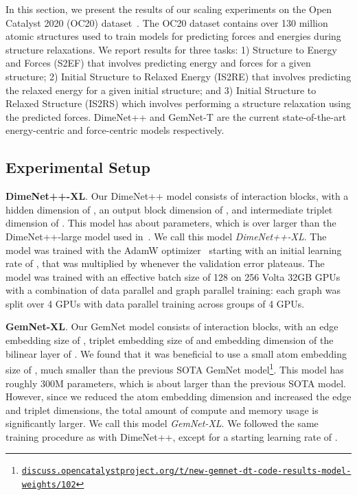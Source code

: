 \documentclass{article} \usepackage{iclr2022_conference,times}
\begin{document}
In this section, we present the results of our scaling experiments on the Open Catalyst 2020 (OC20) dataset~\citep{OC20}. The OC20 dataset contains over 130 million atomic structures used to train models for predicting forces and energies during structure relaxations. We report results for three tasks: 1) Structure to Energy and Forces (S2EF) that involves predicting energy and forces for a given structure; 2) Initial Structure to Relaxed Energy (IS2RE) that involves predicting the relaxed energy for a given initial structure; and 3) Initial Structure to Relaxed Structure (IS2RS) which involves performing a structure relaxation using the predicted forces. DimeNet++ and GemNet-T are the current state-of-the-art energy-centric and force-centric models respectively.

\subsection{Experimental Setup}

\textbf{DimeNet++-XL}. Our DimeNet++ model consists of  interaction blocks, with a hidden dimension of , an output block dimension of , and intermediate triplet dimension of . This model has about  parameters, which is over  larger than the DimeNet++-large model used in~\citep{OC20}. We call this model \emph{DimeNet++-XL}. The model was trained with the AdamW optimizer~\citep{kingma2014adam,loshchilov2019decoupled} starting with an initial learning rate of , that was multiplied by  whenever the validation error plateaus. The model was trained with an effective batch size of 128 on 256 Volta 32GB GPUs with a combination of data parallel and graph parallel training: each graph was split over 4 GPUs with data parallel training across groups of 4 GPUs.

\textbf{GemNet-XL}. Our GemNet model consists of  interaction blocks, with an edge embedding size of , triplet embedding size of  and embedding dimension of the bilinear layer of . We found that it was beneficial to use a small atom embedding size of , much smaller than the previous SOTA GemNet model\footnote{\href{https://discuss.opencatalystproject.org/t/new-gemnet-dt-code-results-model-weights/102}{\tt discuss.opencatalystproject.org/t/new-gemnet-dt-code-results-model-weights/102}}. This model has roughly 300M parameters, which is about  larger than the previous SOTA model. However, since we reduced the atom embedding dimension and increased the edge and triplet dimensions, the total amount of compute and memory usage is significantly larger. We call this model \emph{GemNet-XL}. We followed the same training procedure as with DimeNet++, except for a starting learning rate of .
\end{document}
